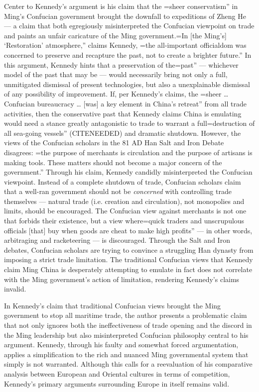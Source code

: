 \documentclass[letterpaper]{article}
\begin{document}
Center to Kennedy's argument is his claim that the
=sheer conservatism'' in Ming's Confucian government brought the downfall to expeditions of Zheng He --- a claim that both egregiously misinterpreted the Confucian viewpoint on trade and paints an unfair caricature of the Ming government.=In
[the Ming's] `Restoration' atmosphere,'' claims Kennedy,
=the all-important officialdom was concerned to preserve and recapture the past, not to create a brighter future.'' In this argument, Kennedy hints that a preservation of the=past''
--- whichever model of the past that may be --- would necessarily bring
not only a full, unmitigated dismissal of present technologies, but also
a unexplainable dismissal of any possibility of improvement. If, per
Kennedy's claims, the
=sheer \ldots{} Confucian bureaucracy \ldots{} [was] a key element in China's retreat'' from all trade activities, then the conservative past that Kennedy claims China is emulating would need a stance greatly antagonistic to trade to warrant a full=destruction
of all sea-going vessels'' (CITENEEDED) and dramatic shutdown. However,
the views of the Confucian scholars in the 81 AD Han Salt and Iron
Debate disagrees:
=the purpose of merchants is circulation and the purpose of artisans is making tools. These matters should not become a major concern of the government.'' Through his claim, Kennedy candidly misinterpreted the Confucian viewpoint. Instead of a complete shutdown of trade, Confucian scholars claim that a well-ran government should not be \textit{concerned} with controlling trade themselves --- natural trade (i.e. creation and circulation), not monopolies and limits, should be encouraged. The Confucian view against merchants is not one that forbids their existence, but a view where=quick
traders and unscrupulous officials [that] buy when goods are cheat to
make high profits'' --- in other words, arbitraging and racketeering ---
is discouraged. Through the Salt and Iron debates, Confucian scholars
are trying to convince a struggling Han dynasty from imposing a strict
trade limitation. The traditional Confucian views that Kennedy claim
Ming China is desperately attempting to emulate in fact does not
correlate with the Ming government's action of limitation, rendering
Kennedy's claims invalid.

In Kennedy's claim that traditional Confucian views brought the Ming
government to stop all maritime trade, the author presents a problematic
claim that not only ignores both the ineffectiveness of trade opening
and the discord in the Ming leadership but also misinterpreted Confucian
philosophy central to his argument. Kennedy, through his faulty and
somewhat forced argumentation, applies a simplification to the rich and
nuanced Ming governmental system that simply is not warranted. Although
this calls for a reevaluation of his comparative analysis between
European and Oriental cultures in terms of competition, Kennedy's
primary arguments surrounding Europe in itself remains valid.
\end{document}
